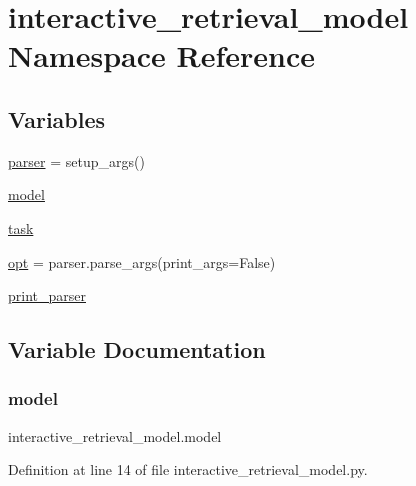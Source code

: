 \hypertarget{namespaceinteractive__retrieval__model}{}\section{interactive\+\_\+retrieval\+\_\+model Namespace Reference}
\label{namespaceinteractive__retrieval__model}
\subsection*{Variables}
\begin{DoxyCompactItemize}
\item 
\hyperlink{namespaceinteractive__retrieval__model_a62d94151a2dc7ec2d34245129f0b998c}{parser} = setup\+\_\+args()
\item 
\hyperlink{namespaceinteractive__retrieval__model_a29a5420a8020fba66c3aeba99ef5bcf7}{model}
\item 
\hyperlink{namespaceinteractive__retrieval__model_a44bfb3433389fbdd57eda97145f58fbb}{task}
\item 
\hyperlink{namespaceinteractive__retrieval__model_a2486dcb9decf8b2a1f7996568e4e9557}{opt} = parser.\+parse\+\_\+args(print\+\_\+args=False)
\item 
\hyperlink{namespaceinteractive__retrieval__model_a0f5333e67eaa29247b99247b44b8f688}{print\+\_\+parser}
\end{DoxyCompactItemize}


\subsection{Variable Documentation}
\mbox{\label{namespaceinteractive__retrieval__model_a29a5420a8020fba66c3aeba99ef5bcf7}} 
\subsubsection{\texorpdfstring{model}{model}}
{\footnotesize\ttfamily interactive\+\_\+retrieval\+\_\+model.\+model}



Definition at line 14 of file interactive\+\_\+retrieval\+\_\+model.\+py.

\mbox{\label{namespaceinteractive__retrieval__model_a2486dcb9decf8b2a1f7996568e4e9557}} 
